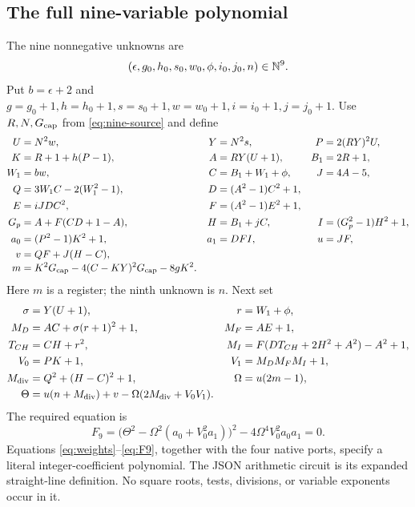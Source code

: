 \subsection{The full nine-variable polynomial}

The nine nonnegative unknowns are
\[
 (\epsilon,g_0,h_0,s_0,w_0,\phi,i_0,j_0,n)\in\mathbb N^9.
\]
Put $b=\epsilon+2$ and
$g=g_0+1,h=h_0+1,s=s_0+1,w=w_0+1,i=i_0+1,j=j_0+1$.
Use $R,N,G_{\rm cap}$ from \eqref{eq:nine-source} and define
\begin{align}
 U&=N^2w,&Y&=N^2s,&P&=2(RY)^2U,\nonumber\\
 K&=R+1+h(P-1),&A&=RY(U+1),&B_1&=2R+1,\nonumber\\
 W_1&=bw,&C&=B_1+W_1+\phi,&J&=4A-5,\nonumber\\
 Q&=3W_1C-2(W_1^2-1),&D&=(A^2-1)C^2+1,\nonumber\\
 E&=iJDC^2,&F&=(A^2-1)E^2+1,\nonumber\\
 G_p&=A+F(CD+1-A),&H&=B_1+jC,&I&=(G_p^2-1)H^2+1,\nonumber\\
 a_0&=(P^2-1)K^2+1,&a_1&=DFI,&u&=JF,\nonumber\\
 v&=QF+J(H-C),&&&\nonumber\\[-1mm]
 m&=K^2G_{\rm cap}-4(C-KY)^2G_{\rm cap}-8gK^2.&&&
 \label{eq:jones-ratio}
\end{align}
Here $m$ is a register; the ninth unknown is $n$. Next set
\begin{align}
 \sigma&=Y(U+1),&r&=W_1+\phi,\nonumber\\
 M_D&=AC+\sigma(r+1)^2+1,&M_F&=AE+1,\nonumber\\
 T_{CH}&=CH+r^2,&
 M_I&=F(DT_{CH}+2H^2+A^2)-A^2+1,\nonumber\\
 V_0&=PK+1,&V_1&=M_DM_FM_I+1,\nonumber\\
 M_{\rm div}&=Q^2+(H-C)^2+1,&
 \Omega&=u(2m-1),\nonumber\\
 \Theta&=u(n+M_{\rm div})+v
          -\Omega(2M_{\rm div}+V_0V_1).&&
 \label{eq:majorants}
\end{align}
The required equation is
\begin{equation}
 \boxed{F_9=
   \bigl(\Theta^2-\Omega^2(a_0+V_0^2a_1)\bigr)^2
    -4\Omega^4V_0^2a_0a_1=0.}
 \label{eq:F9}
\end{equation}
Equations \eqref{eq:weights}--\eqref{eq:F9}, together with the four
native ports, specify a literal integer-coefficient polynomial. The
JSON arithmetic circuit is its expanded straight-line definition.
No square roots, tests, divisions, or variable exponents occur in it.

